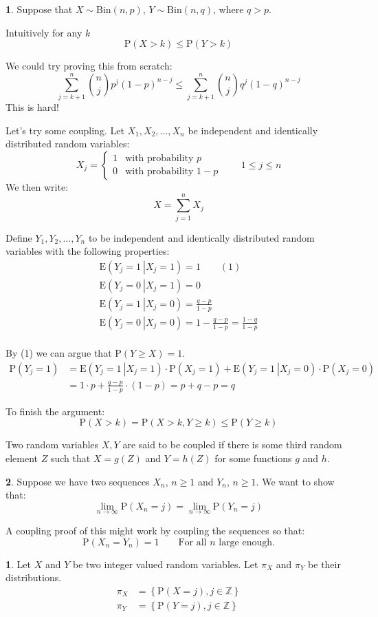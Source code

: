 \documentclass[english,12pt]{article}
\theoremstyle{plain}
\theoremstyle{definition}
\newtheorem*{definition}{\protect\definitionname}
\newtheorem*{example}{\protect\examplename}
\theoremstyle{definition} %
\newcommand{\defn}[1]{\begin{definition} #1 \end{definition} }
\newcommand{\eg}[1]{\begin{example} #1 \end{example} }
\providecommand{\definitionname}{Definition}
\providecommand{\examplename}{Example}
\newcommand{\curlybrac}[1]{\left\{#1\right\}} %
\newcommand{\Z}{\mathbb{Z}} %
\newcommand{\p}[1]{\mbox{P} \left( #1 \right)}
\newcommand{\condp}[2]{\mbox{E} \left( \left. #1 \ \right\vert \left. #2 \right. \right)}
\begin{document}
\eg{
Suppose that $X\sim\text{Bin}(n,p)$, $Y\sim\text{Bin}(n,q)$, where $q>p$.

Intuitively for any $k$
\[\text{P}(X>k)\le \text{P}(Y>k)\]

We could try proving this from scratch:
\[\sum_{j=k+1}^n{n\choose j}p^j(1-p)^{n-j}\le \sum_{j=k+1}^n{n\choose j}q^j(1-q)^{n-j}\]
This is hard!

Let's try some coupling.  Let $X_1,X_2,\ldots,X_n$ be independent and identically distributed random variables:
\[X_j=\begin{cases}1 & \text{with probability }p\\0 & \text{with probability }1-p\end{cases}\qquad 1\le j\le n\]
We then write:
\[X=\sum_{j=1}^n X_j\]

Define $Y_1,Y_2,\ldots,Y_n$ to be independent and identically distributed random variables with the following properties:
\begin{align*}
\condp{Y_j=1}{X_j=1}=1\qquad (1)\\
\condp{Y_j=0}{X_j=1}=0\\
\condp{Y_j=1}{X_j=0}=\frac{q-p}{1-p}\\
\condp{Y_j=0}{X_j=0}=1-\frac{q-p}{1-p}=\frac{1-q}{1-p}\\
\end{align*}


By (1) we can argue that $\p{Y\ge X}=1$.
\begin{align*}
\p{Y_j=1}&=\condp{Y_j=1}{X_j=1}\cdot\p{X_j=1}+\condp{Y_j=1}{X_j=0}\cdot\p{X_j=0}\\
&=1\cdot p+\frac{q-p}{1-p}\cdot(1-p)
=p+q-p
=q
\end{align*}

To finish the argument:
\[\p{X>k}=\p{X>k,Y\ge k}\le\p{Y\ge k}\]
}

Two random variables $X,Y$ are said to be coupled if there is some third random element $Z$ such that $X=g(Z)$ and $Y=h(Z)$ for some functions $g$ and $h$.

\eg{
Suppose we have two sequences $X_n$, $n\ge 1$ and $Y_n$, $n\ge 1$.  We want to show that:
\[\lim_{n\to\infty}\p{X_n=j}=\lim_{n\to\infty}\p{Y_n=j}\]

A coupling proof of this might work by coupling the sequences so that:
\[\p{X_n=Y_n}=1\qquad\text{For all }n\text{ large enough.}\]
}

\defn{
Let $X$ and $Y$ be two integer valued random variables.  Let $\pi_X$ and $\pi_Y$ be their distributions.
\begin{align*}
\pi_X&=\curlybrac{\p{X=j},j\in\Z}\\
\pi_Y&=\curlybrac{\p{Y=j},j\in\Z}\\
\end{align*}
}
\end{document}
